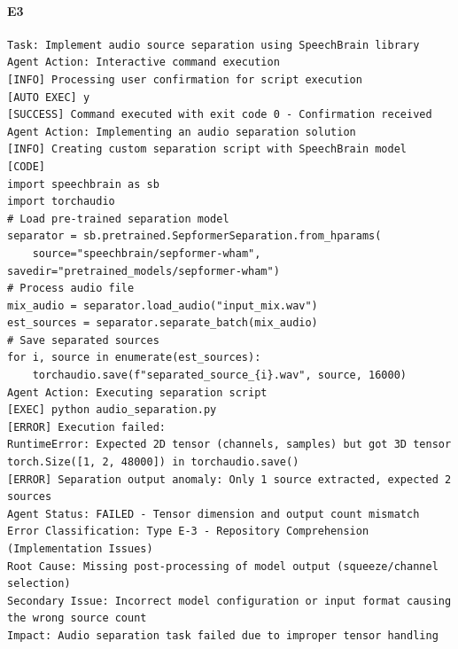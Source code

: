 \paragraph{E3}
\begin{lstlisting}[language={},caption={SpeechBrain audio separation failed due to tensor dimension mismatch.},label={lst:speechbrain-tensor}]
Task: Implement audio source separation using SpeechBrain library
Agent Action: Interactive command execution
[INFO] Processing user confirmation for script execution
[AUTO EXEC] y
[SUCCESS] Command executed with exit code 0 - Confirmation received
Agent Action: Implementing an audio separation solution
[INFO] Creating custom separation script with SpeechBrain model
[CODE] 
import speechbrain as sb
import torchaudio
# Load pre-trained separation model
separator = sb.pretrained.SepformerSeparation.from_hparams(
    source="speechbrain/sepformer-wham", savedir="pretrained_models/sepformer-wham")
# Process audio file
mix_audio = separator.load_audio("input_mix.wav")
est_sources = separator.separate_batch(mix_audio)
# Save separated sources
for i, source in enumerate(est_sources):
    torchaudio.save(f"separated_source_{i}.wav", source, 16000)
Agent Action: Executing separation script
[EXEC] python audio_separation.py
[ERROR] Execution failed:
RuntimeError: Expected 2D tensor (channels, samples) but got 3D tensor 
torch.Size([1, 2, 48000]) in torchaudio.save()
[ERROR] Separation output anomaly: Only 1 source extracted, expected 2 sources
Agent Status: FAILED - Tensor dimension and output count mismatch
Error Classification: Type E-3 - Repository Comprehension (Implementation Issues)
Root Cause: Missing post-processing of model output (squeeze/channel selection)
Secondary Issue: Incorrect model configuration or input format causing the wrong source count
Impact: Audio separation task failed due to improper tensor handling
\end{lstlisting}

